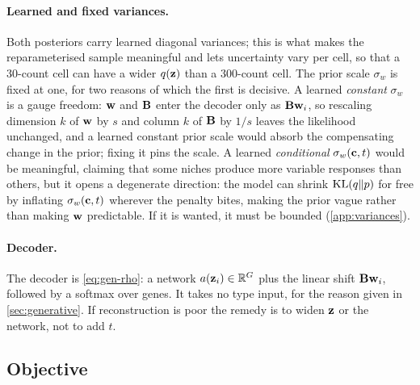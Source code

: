 \paragraph{Learned and fixed variances.}
 Both posteriors carry learned diagonal variances; this is what makes the reparameterised sample meaningful \citep{kingma2014,rezende2014} and lets uncertainty vary per cell, so that a 30-count cell can have a wider $q(\mathbf{z})$ than a 300-count cell. The prior scale $\sigma_w$ is fixed at one, for two reasons of which the first is decisive. A learned \emph{constant} $\sigma_w$ is a gauge freedom: $\mathbf{w}$ and $\mathbf{B}$ enter the decoder only as $\mathbf{B}\mathbf{w}_i$, so rescaling dimension $k$ of $\mathbf{w}$ by $s$ and column $k$ of $\mathbf{B}$ by $1/s$ leaves the likelihood unchanged, and a learned constant prior scale would absorb the compensating change in the prior; fixing it pins the scale. A learned \emph{conditional} $\sigma_w(\mathbf{c}, t)$ would be meaningful, claiming that some niches produce more variable responses than others, but it opens a degenerate direction: the model can shrink $\operatorname{KL}(q\|p)$ for free by inflating $\sigma_w(\mathbf{c},t)$ wherever the penalty bites, making the prior vague rather than making $\mathbf{w}$ predictable. If it is wanted, it must be bounded (\cref{app:variances}).

\paragraph{Decoder.}
 The decoder is \cref{eq:gen-rho}: a network $a(\mathbf{z}_i) \in \mathbb{R}^G$ plus the linear shift $\mathbf{B} \mathbf{w}_i$, followed by a softmax over genes. It takes no type input, for the reason given in \cref{sec:generative}. If reconstruction is poor the remedy is to widen $\mathbf{z}$ or the network, not to add $t$.

\subsection{Objective}
\label{sec:objective}

